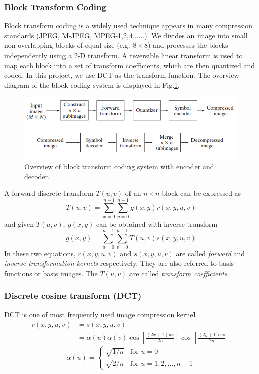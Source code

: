 \subsubsection{Block Transform Coding}
Block transform coding is a widely used technique appears in many compression standards (JPEG, M-JPEG, MPEG-1,2,4......). We divides an image into small non-overlapping blocks of equal size (e.g. $8\times 8$) and processes the blocks independently using a 2-D transform. A reversible linear transform is used to map each block into a set of transform coefficients, which are then quantized and coded. In this project, we use DCT as the transform function. The overview diagram of the block coding system is displayed in Fig.\ref{fig:blocksys}. 
\begin{figure}[h!]
	\centering	
	\includegraphics[width=0.4\linewidth]{myfigure/p7/block_system.png}
	\caption{Overview of block transform coding system with encoder and decoder.}
	\label{fig:blocksys}
\end{figure}
A forward discrete transform $T(u,v)$ of an $n\times n$ block can be expressed as \begin{equation} T(u,v)=\sum_{x=0}^{n-1}\sum_{y=0}^{n-1}g(x,y)r(x,y,u,v) \end{equation} and given $T(u,v)$, $g(x,y)$ can be obtained with inverse transform \begin{equation} g(x,y)=\sum_{u=0}^{n-1}\sum_{v=0}^{n-1}T(u,v)s(x,y,u,v) \end{equation} In these two equations, $r(x,y,u,v)$ and $s(x,y,u,v)$ are called \emph{forward} and \emph{inverse transformation kernels} respectively. They are also referred to basis functions or basis images. The $T(u,v)$ are called \emph{transform coefficients}.
\subsubsection{Discrete cosine transform (DCT)}
DCT is one of most frequently used image compression kernel
\begin{equation}\begin{aligned} r(x,y,u,v)&=s(x,y,u,v)\\ 
&=\alpha(u)\alpha(v)\cos\left[ \frac{(2x+1)u\pi}{2n}\right] \cos\left[ \frac{(2y+1)v\pi}{2n} \right]
\end{aligned}\end{equation} 
\begin{equation} \alpha(u) = \left\{ \begin{array}{rcl}
\sqrt{1/n} & \text{for } u=0 \\
\sqrt{2/n} & \text{for } u=1,2,...,n-1
\end{array} \right. \end{equation}
